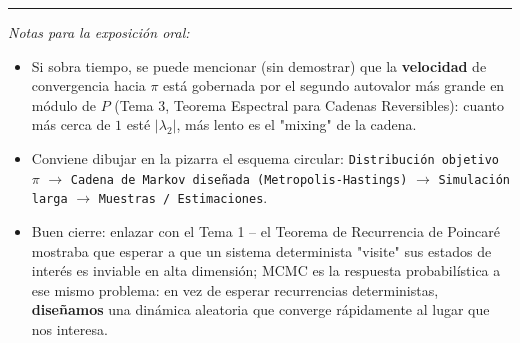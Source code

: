 \bigskip
\hrule
\bigskip

\noindent\textit{Notas para la exposición oral:}
\begin{itemize}
    \item Si sobra tiempo, se puede mencionar (sin demostrar) que la \textbf{velocidad} de convergencia hacia $\pi$ está gobernada por el segundo autovalor más grande en módulo de $P$ (Tema 3, Teorema Espectral para Cadenas Reversibles): cuanto más cerca de $1$ esté $|\lambda_2|$, más lento es el "mixing" de la cadena.
    \item Conviene dibujar en la pizarra el esquema circular: \texttt{Distribución objetivo $\pi$} $\to$ \texttt{Cadena de Markov diseñada (Metropolis-Hastings)} $\to$ \texttt{Simulación larga} $\to$ \texttt{Muestras / Estimaciones}.
    \item Buen cierre: enlazar con el Tema 1 -- el Teorema de Recurrencia de Poincaré mostraba que esperar a que un sistema determinista "visite" sus estados de interés es inviable en alta dimensión; MCMC es la respuesta probabilística a ese mismo problema: en vez de esperar recurrencias deterministas, \textbf{diseñamos} una dinámica aleatoria que converge rápidamente al lugar que nos interesa.
\end{itemize}